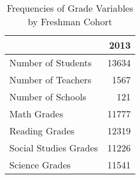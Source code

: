 \begin{table}

\caption{\label{tab:table_freq}Frequencies of Grade Variables by Freshman Cohort}
\centering
\begin{tabular}[t]{lr}
\toprule
  & 2013\\
\midrule
Number of Students & 13634\\
Number of Teachers & 1567\\
Number of Schools & 121\\
\addlinespace
Math Grades & 11777\\
Reading Grades & 12319\\
Social Studies Grades & 11226\\
Science Grades & 11541\\
\bottomrule
\end{tabular}
\end{table}
